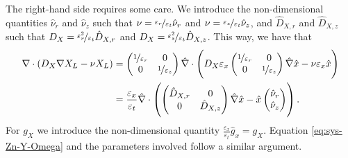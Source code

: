 \documentclass[11pt]{article}
\numberwithin{equation}{section}
\begin{document}
The right-hand side requires some care. 
We introduce the non-dimensional quantities \( \hat{\nu}_r\) and \( \hat{\nu}_z\) such that \( \nu = \nicefrac{\varepsilon_r}{\varepsilon_t} \hat{\nu}_r \) and \( \nu = \nicefrac{\varepsilon_z}{\varepsilon_t} \hat{\nu}_z \),
and \(\hat{D}_{X,r}\) and \(\hat{D}_{X,z}\) 
such that \(D_{X} = \nicefrac{\varepsilon_r^2}{\varepsilon_t} \hat{D}_{X,r}\) and \(D_{X} = \nicefrac{\varepsilon_z^2}{\varepsilon_t} \hat{D}_{X,z}\). This way, we have that
\begin{align}
    \nabla \cdot ( D_X \nabla X_L - \nu X_L  )
    &=
    \begin{pmatrix}
        \nicefrac{1}{\varepsilon_r} & 0 \\
        0 & \nicefrac{1}{\varepsilon_z}
    \end{pmatrix}
    \hat{\nabla}
    \cdot
    \left( 
        D_X
        \varepsilon_x
        \begin{pmatrix}
        \nicefrac{1}{\varepsilon_r} & 0 \\
        0 & \nicefrac{1}{\varepsilon_z}
    \end{pmatrix}
    \hat{\nabla} \hat{x} - \nu \varepsilon_x \hat{x}
    \right)
    \notag
    \\
    &= \frac{\varepsilon_x}{\varepsilon_t}
    \hat{\nabla}
    \cdot
    \left( 
        \begin{pmatrix}
         \hat{D}_{X,r} & 0 
         \\
        0 &  \hat{D}_{X,z}
    \end{pmatrix}
    \hat{\nabla} \hat{x} - \hat{x}
    \begin{pmatrix}
         \hat{\nu}_{r} 
         \\
        \hat{\nu}_{z}
    \end{pmatrix}
    \right).
    \label{eq:divergence-non-dimen-x}
\end{align}
For \(g_X\) we 
introduce the non-dimensional quantity \( \frac{\varepsilon_x}{\varepsilon_t}\hat{g}_{x} = g_X\). Equation \eqref{eq:sys-Zn-Y-Omega} and the parameters involved follow a similar argument.





\end{document}
